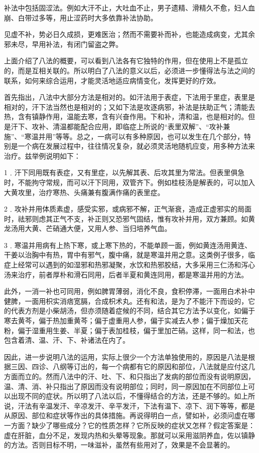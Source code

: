 \documentclass[12pt,UTF8]{ctexbook}
\begin{document}
补法中包括固涩法。例如大汗不止，大吐血不止，男子遗精、滑精久不愈，妇人血崩、白带过多等，用止涩药时大多依靠补法协助。

见虚不补，势必日久成损，更难医治；然而不需要补而补，也能造成病变，尤其余邪未尽，早用补法，有闭门留盗之弊。

上面介绍了八法的概要，可以看到八法各有它独特的作用，但在使用上不是孤立的，而是互相关联的。所以明白了八法的意义以后，必须进一步懂得法与法之间的联系，如何来综合运用，才能灵活地适应病情变化，发挥更好的疗效。

首先指出，八法中大部分方法是相对的。如汗法用于表症，下法用于里症，表里是相对的，汗下法当然也是相对的；又如下法是攻逐病邪，补法是扶助正气；清能去热，含有镇静作用，温能去寒，含有兴奋作用。下和补，清和温，也是相对的。但是汗下、攻补、清温都能配合应用，即临症上所说的“表里双解”、“攻补兼施”、“寒温并用”等等。总之，一病可以有多种原因，也可以发生在几个部分，特别是一个病在发展过程中，往往情况复杂，就必须灵活地随机应变，用多种方法来治疗。兹举例说明如下：

1﹒汗下同用既有表症，又有里症，以先解其表、后攻其里为常法。但表里俱急时，不能拘守常规，而可以汗下同用，双管齐下。例如桂枝汤是解表的，可以加入大黄攻里，治疗寒热、头痛兼有腹满作痛的表里症。

2﹒攻补并用体质素虚，感受实邪，或病邪不解，正气渐衰，造成正虚邪实的局面时，祛邪则虑其正气不支，补正则又恐邪气固结，惟有攻补并用，双方兼顾。如黄龙汤用大黄、芒硝通大便，又用人参、当归培养气血。

3﹒寒温并用病有上热下寒，或上寒下热的，不能单顾一面，例如黄连汤用黄连、干姜以治胸中有热，胃中有邪气，腹中痛，就是寒温并用之意。这类例子很多，临症上经常可以遇到的如湿邪和热邪凝聚，水饮和热邪胶结，大多采用三仁汤和泻心汤来治疗，前者厚朴和滑石同用，后者半夏和黄连同用，都是寒温并用的方法。

此外，一消一补也可同用，例如脾胃薄弱，消化不良，食积停滞，一面用白术补中健脾，一面用枳实消痞宽膈，合成枳术丸。还有和法，是为了不能汗下而设的，它的代表方剂是小柴胡汤，但亦须随着症候的不同，结合其它方法予以变化，如偏于寒去黄芩，偏于热加重黄芩；偏于虚重用人参，偏于实减去人参；偏于燥加天花粉，偏于湿重用生姜、半夏；偏于表加桂枝，偏于里加芒硝。这样，同一和法，也包含着清、温、汗、下、补诸法在内了。

因此，进一步说明八法的运用，实际上很少一个方法单独使用的，原因是八法是根据三因、四诊、八纲等订出的，每一个病都有它的原因和部位，八法就是应付这几方面而立的。然而八法中的汗、吐、下、和只指出了发病的部位而没有说明原因，温、清、消、补只指出了原因而没有说明部位；同时，同一原因加在不同部位上可以出现不同的症状。所以明了八法以后，不懂得结合的方法，还是不够的。如上所说，汗法有辛温发汗、辛凉发汗、辛平发汗，下法有温下、凉下、润下等等，都是从原因、部位和症状等作出的具体措施。再说得明白一点，譬如补，必须问虚在哪一方面？缺少了哪些成分？它的性质怎样？它所反映的症状又怎样？假定答案是：虚在肝脏，血分不足，发现内热和头晕等现象。那就可以采用滋阴养血，佐以镇静的方法。否则目标不明，一味滋补，虽然有些用对了，效果是不会显著的。
\end{document}
